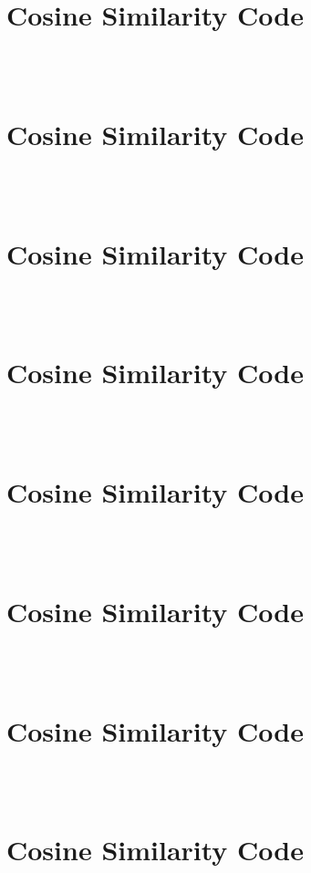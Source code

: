 \documentclass{article}
\begin{document}
\section*{Cosine Similarity Code}
\begin{lstlisting}[language=Java, caption=Cosine Similarity Implementation]

\end{lstlisting}\\
\section*{Cosine Similarity Code}
\begin{lstlisting}[language=Java, caption=Cosine Similarity Implementation]

\end{lstlisting}\\
\section*{Cosine Similarity Code}
\begin{lstlisting}[language=Java, caption=Cosine Similarity Implementation]

\end{lstlisting}\\
\section*{Cosine Similarity Code}
\begin{lstlisting}[language=Java, caption=Cosine Similarity Implementation]

\end{lstlisting}\\
\section*{Cosine Similarity Code}
\begin{lstlisting}[language=Java, caption=Cosine Similarity Implementation]

\end{lstlisting}\\
\section*{Cosine Similarity Code}
\begin{lstlisting}[language=Java, caption=Cosine Similarity Implementation]

\end{lstlisting}\\
\section*{Cosine Similarity Code}
\begin{lstlisting}[language=Java, caption=Cosine Similarity Implementation]

\end{lstlisting}\\
\section*{Cosine Similarity Code}
\begin{lstlisting}[language=Java, caption=Cosine Similarity Implementation]

\end{lstlisting}\\
\end{document}
